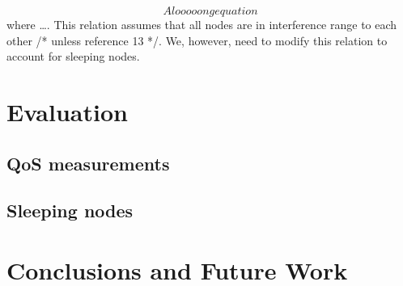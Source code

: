 \documentclass[10pt, conference]{IEEEtran}
\begin{document}
\begin{equation}
\label{eq:throughput}
A looooong equation
\end{equation}
where \ldots. This relation assumes that all nodes are in interference range to each other /* unless reference 13 */. We, however, need to modify this relation to account for sleeping nodes.

\section{Evaluation}

\subsection{QoS measurements}

\subsection{Sleeping nodes}


\section{Conclusions and Future Work}\label{sec:conclusions}




\end{document}
